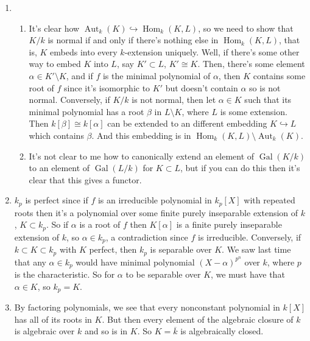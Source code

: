 \documentclass{article}
\DeclareMathOperator\Hom{Hom}
\DeclareMathOperator\Aut{Aut}
\DeclareMathOperator\Gal{Gal}
\begin{document}
\begin{enumerate}
   \item
      \begin{enumerate}
         \item It's clear how $\Aut_k(K) \hookrightarrow \Hom_k(K,L)$, so we
            need to show that $K/k$ is normal if and only if there's nothing
            else in $\Hom_k(K,L)$, that is, $K$ embeds into every $k$-extension
            uniquely. Well, if there's some other way to embed $K$ into $L$, say
            $K' \subset L$, $K' \cong K$. Then, there's some element $\alpha
            \in K' \setminus K$, and if $f$ is the minimal polynomial of
            $\alpha$, then $K$ contains some root of $f$ since it's isomorphic
            to $K'$ but doesn't contain $\alpha$ so is not normal. Conversely,
            if $K/k$ is not normal, then let $\alpha \in K$ such that its
            minimal polynomial has a root $\beta$ in $L \setminus K$, where $L$
            is some extension. Then $k[\beta] \cong k[\alpha]$ can be extended
            to an different embedding $K \hookrightarrow L$ which contains
            $\beta$. And this embedding is in $\Hom_k(K,L) \setminus \Aut_k(K)$.

         \item It's not clear to me how to canonically extend an element of
            $\Gal(K/k)$ to an element of $\Gal(L/k)$ for $K \subset L$, but if
            you can do this then it's clear that this gives a functor.
      \end{enumerate}

   \item $k_p$ is perfect since if $f$ is an irreducible polynomial in $k_p[X]$
      with repeated roots then it's a polynomial over some finite purely
      inseparable extension of $k$, $K \subset k_p$. So if $\alpha$ is a root of
      $f$ then $K[\alpha]$ is a finite purely inseparable extension of $k$, so
      $\alpha \in k_p$, a contradiction since $f$ is irreducible. Conversely, if
      $k \subset K \subset k_p$ with $K$ perfect, then $k_p$ is separable over
      $K$. We saw last time that any $\alpha \in k_p$ would have minimal
      polynomial $(X-\alpha)^{p^n}$ over $k$, where $p$ is the characteristic.
      So for $\alpha$ to be separable over $K$, we must have that $\alpha \in
      K$, so $k_p = K$.

   \item By factoring polynomials, we see that every nonconstant polynomial in
      $k[X]$ has all of its roots in $K$. But then every element of the
      algebraic closure of $k$ is algebraic over $k$ and so is in $K$. So $K =
      \overline k$ is algebraically closed.


\end{enumerate}
\end{document}
